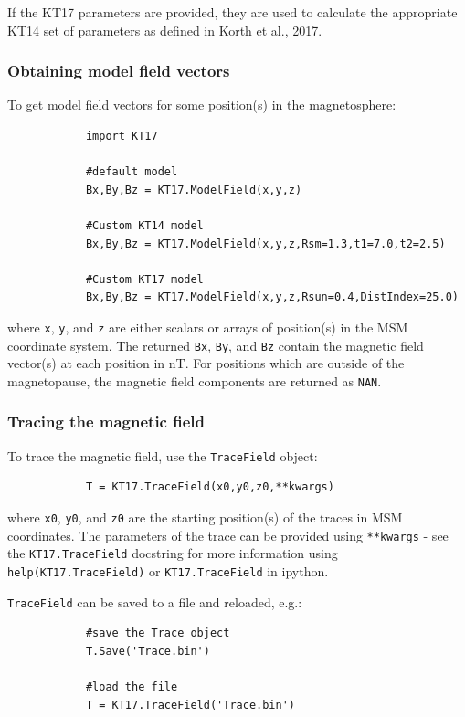 			If the KT17 parameters are provided, they are used to calculate the appropriate KT14 set of parameters as defined in Korth et al., 2017.
			
			\subsubsection{Obtaining model field vectors}
			
			To get model field vectors for some position(s) in the magnetosphere:
			
			\begin{verbatim}
			import KT17
			
			#default model
			Bx,By,Bz = KT17.ModelField(x,y,z)
			
			#Custom KT14 model
			Bx,By,Bz = KT17.ModelField(x,y,z,Rsm=1.3,t1=7.0,t2=2.5)
			
			#Custom KT17 model
			Bx,By,Bz = KT17.ModelField(x,y,z,Rsun=0.4,DistIndex=25.0)
			\end{verbatim}
			
			where \texttt{x}, \texttt{y}, and \texttt{z} are either scalars or arrays of position(s) in the MSM coordinate system. The returned \texttt{Bx}, \texttt{By}, and \texttt{Bz} contain the magnetic field vector(s) at each position in nT. For positions which are outside of the magnetopause, the magnetic field components are returned as \texttt{NAN}.
			
			\subsubsection{Tracing the magnetic field}
			
			To trace the magnetic field, use the \texttt{TraceField} object:
			
			\begin{verbatim}
			T = KT17.TraceField(x0,y0,z0,**kwargs)
			\end{verbatim}
			
			where \texttt{x0}, \texttt{y0}, and \texttt{z0} are the starting position(s) of the traces in MSM coordinates. The parameters of the trace can be provided using \texttt{**kwargs} - see the \texttt{KT17.TraceField} docstring for more information using \texttt{help(KT17.TraceField)} or \texttt{KT17.TraceField\?} in ipython.
			
			\texttt{TraceField} can be saved to a file and reloaded, e.g.:
			
			\begin{verbatim}
			#save the Trace object
			T.Save('Trace.bin')
			
			#load the file
			T = KT17.TraceField('Trace.bin')
			\end{verbatim}
			
